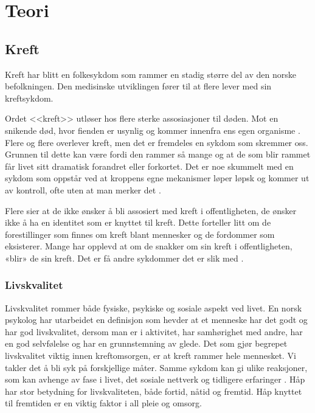 \chapter{Teori}
\section{Kreft}

Kreft har blitt en folkesykdom som rammer en stadig større del av den norske
befolkningen. Den medisinske utviklingen fører til at flere lever med sin
kreftsykdom.

Ordet <<kreft>> utløser hos flere sterke assosiasjoner til døden. Mot en
snikende død, hvor fienden er usynlig og kommer innenfra ens egen organisme
\cite[s.~8]{amas2007}.  Flere og flere overlever kreft, men det er fremdeles en
sykdom som skremmer oss. Grunnen til dette kan være fordi den rammer så mange
og at de som blir rammet får livet sitt dramatisk forandret eller forkortet.
Det er noe skummelt med en sykdom som oppstår ved at kroppens egne mekanismer
løper løpsk og kommer ut av kontroll, ofte uten at man merker det
\cite[s.~8]{amas2007}.

Flere sier at de ikke ønsker å bli assosiert med kreft i
offentligheten, de ønsker ikke å ha en identitet som er knyttet til kreft.
Dette forteller litt om de forestillinger som finnes om kreft blant mennesker
og de fordommer som eksisterer. Mange har opplevd at om de snakker om sin kreft
i offentligheten, «blir» de sin kreft. Det er få andre sykdommer det er slik
med \cite[s.~10]{amas2007}.

\subsection{Livskvalitet}

Livskvalitet rommer både fysiske, psykiske og sosiale aspekt ved livet. En
norsk psykolog har utarbeidet en definisjon som hevder at et menneske har det
godt og har god livskvalitet, dersom man er i aktivitet, har samhørighet med
andre, har en god selvfølelse og har en grunnstemning av glede. Det som gjør
begrepet livskvalitet viktig innen kreftomsorgen, er at kreft rammer hele
mennesket. Vi takler det å bli syk på forskjellige måter. Samme sykdom kan gi
ulike reaksjoner, som kan avhenge av fase i livet, det sosiale nettverk og
tidligere erfaringer \cite[s.~39-40]{rustoen2008}. Håp har stor betydning for
livskvaliteten, både fortid, nåtid og fremtid. Håp knyttet til fremtiden er en
viktig faktor i all pleie og omsorg. 

